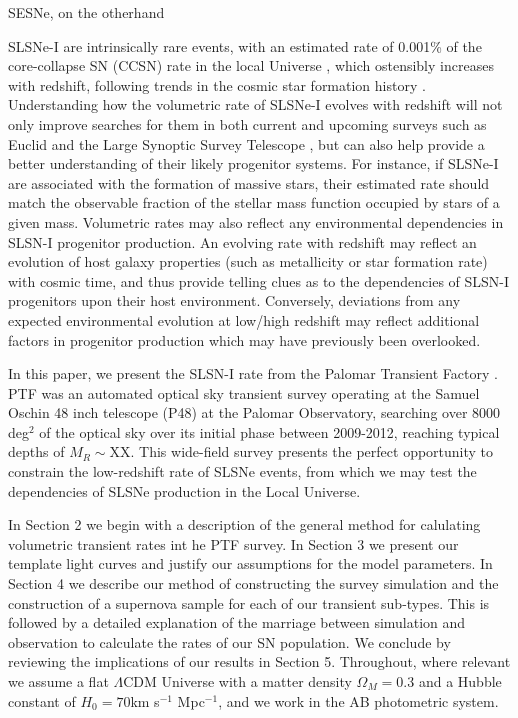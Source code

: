 \documentclass[a4paper,fleqn,usenatbib]{mnras}
\newcommand{\angus}[1]{\color{JungleGreen}#1\color{black}}
\begin{document}
SESNe, on the otherhand 

SLSNe-I are intrinsically rare events, with an estimated rate of 0.001\% of the core-collapse SN (CCSN) rate in the local Universe \citep{Quimby2011,Quimby2013,McCrum2015}, which ostensibly increases with redshift, following trends in the cosmic star formation history \citep{Prajs2016,Cooke2012,Moriya2018}. Understanding how the volumetric rate of SLSNe-I evolves with redshift will not only improve searches for them in both current and upcoming surveys such as Euclid and the Large Synoptic Survey Telescope \citep{Inserra2017Euclid,Villar2018}, but can also help provide a better understanding of their likely progenitor systems. For instance, if SLSNe-I are associated with the formation of massive stars, their estimated rate should match the observable fraction of the stellar mass function occupied by stars of a given mass. Volumetric rates may also reflect any environmental dependencies in SLSN-I progenitor production. An evolving rate with redshift may reflect an evolution of host galaxy properties (such as metallicity or star formation rate) with cosmic time, and thus provide telling clues as to the dependencies of SLSN-I progenitors upon their host environment. Conversely, deviations from any expected environmental evolution at low/high redshift may reflect additional factors in progenitor production which may have previously been overlooked.


In this paper, we present the SLSN-I rate from the Palomar Transient Factory \citep[PTF;][]{PTF_REF}. PTF was an automated optical sky transient survey operating at the Samuel Oschin 48 inch telescope (P48) at the Palomar Observatory, searching over 8000 deg$^{2}$ of the optical sky over its initial phase between 2009-2012, reaching typical depths of $M_{R}\sim$\angus{XX}. This wide-field survey presents the perfect opportunity to constrain the low-redshift rate of SLSNe events, from which we may test the dependencies of SLSNe production in the Local Universe. 

In Section 2 we begin with a description of the general method for calulating volumetric transient rates int he PTF survey. In Section 3 we present our template light curves and justify our assumptions for the model parameters. In Section 4 we describe our method of constructing the survey simulation and the construction of a supernova sample for each of our transient sub-types. This is followed by a detailed explanation of the marriage between simulation and observation to calculate the rates of our SN population. We conclude by reviewing the implications of our results in Section 5. Throughout, where relevant we assume a flat $\Lambda$CDM Universe with a matter density $\Omega_{M}=0.3$ and a Hubble constant of $H_{0}= 70$km s$^{−1}$ Mpc$^{−1}$, and we work in the AB photometric system.
\end{document}
